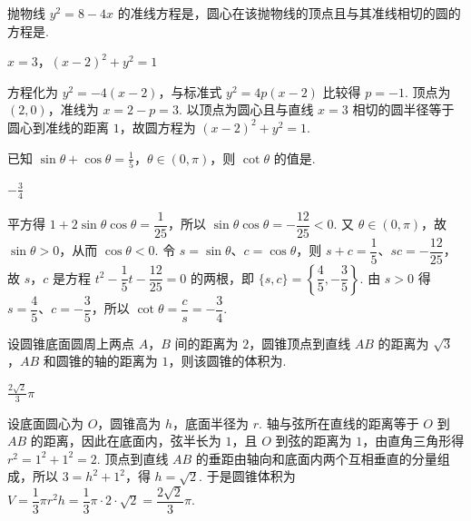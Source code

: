 \documentclass[UTF8,a4paper,oneside,11pt]{ctexbook}
\begin{document}
\begin{problem}
抛物线 \(y^{2} = 8 - 4x \) 的准线方程是\fillinblank{}，圆心在该抛物线的顶点且与其准线相切的圆的方程是\fillinblank{}.
\end{problem}

\begin{answer}
\(x=3\)，\(\left(x-2\right)^2+y^2=1\)
\end{answer}

\begin{solution}
方程化为 \(y^2=-4(x-2)\)，与标准式 \(y^2=4p(x-2)\) 比较得 \(p=-1\). 顶点为 \((2,0)\)，准线为 \(x=2-p=3\). 以顶点为圆心且与直线 \(x=3\) 相切的圆半径等于圆心到准线的距离 \(1\)，故圆方程为 \((x-2)^2+y^2=1\).
\end{solution}

\begin{problem}
已知 \(\sin \theta + \cos \theta = \frac{1}{5}\)，\(\theta \in (0, \pi)\)，则 \(\cot \theta\) 的值是\fillinblank{}.
\end{problem}

\begin{answer}
\(-\frac{3}{4}\)
\end{answer}

\begin{solution}
平方得 \(1+2\sin\theta\cos\theta=\dfrac1{25}\)，所以 \(\sin\theta\cos\theta=-\dfrac{12}{25}<0\). 又 \(\theta\in(0,\pi)\)，故 \(\sin\theta>0\)，从而 \(\cos\theta<0\). 令 \(s=\sin\theta\)、\(c=\cos\theta\)，则 \(s+c=\dfrac15\)、\(sc=-\dfrac{12}{25}\)，故 \(s\)，\(c\) 是方程 \(t^2-\dfrac15t-\dfrac{12}{25}=0\) 的两根，即 \(\{s,c\}=\left\{\dfrac45,-\dfrac35\right\}\). 由 \(s>0\) 得 \(s=\dfrac45\)、\(c=-\dfrac35\)，所以 \(\cot\theta=\dfrac c s=-\dfrac34\).
\end{solution}

\begin{problem}
设圆锥底面圆周上两点 \(A\)，\(B\) 间的距离为 \(2\)，圆锥顶点到直线 \(AB\) 的距离为 \(\sqrt{3}\)，\(AB\) 和圆锥的轴的距离为 \(1\)，则该圆锥的体积为\fillinblank{}.
\end{problem}

\begin{answer}
\(\frac{2\sqrt{2}}{3}\pi\)
\end{answer}

\begin{solution}
设底面圆心为 \(O\)，圆锥高为 \(h\)，底面半径为 \(r\). 轴与弦所在直线的距离等于 \(O\) 到 \(AB\) 的距离，因此在底面内，弦半长为 \(1\)，且 \(O\) 到弦的距离为 \(1\)，由直角三角形得 \(r^2=1^2+1^2=2\). 顶点到直线 \(AB\) 的垂距由轴向和底面内两个互相垂直的分量组成，所以 \(3=h^2+1^2\)，得 \(h=\sqrt2\). 于是圆锥体积为 \(V=\dfrac13\pi r^2h=\dfrac13\pi\cdot2\cdot\sqrt2=\dfrac{2\sqrt2}{3}\pi\).
\end{solution}
\end{document}
